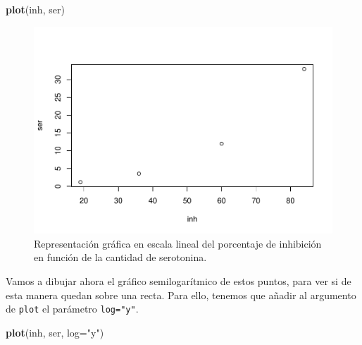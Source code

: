 \documentclass[
]{book}
\newenvironment{Shaded}{\begin{snugshade}}{\end{snugshade}}
\newcommand{\DataTypeTok}[1]{\textcolor[rgb]{0.13,0.29,0.53}{#1}}
\newcommand{\KeywordTok}[1]{\textcolor[rgb]{0.13,0.29,0.53}{\textbf{#1}}}
\newcommand{\NormalTok}[1]{#1}
\newcommand{\StringTok}[1]{\textcolor[rgb]{0.31,0.60,0.02}{#1}}
\theoremstyle{definition}
\theoremstyle{definition}
\theoremstyle{definition}
\theoremstyle{remark}
\begin{document}
\begin{Shaded}
\begin{Highlighting}[]
\KeywordTok{plot}\NormalTok{(inh, ser)}
\end{Highlighting}
\end{Shaded}

\begin{figure}

{\centering \includegraphics[width=0.9\linewidth]{03chap02_Un_aperitivo_files/figure-latex/F304bis-1} 

}

\caption{Representación gráfica en escala lineal del porcentaje de inhibición en función de la cantidad de serotonina.}\label{fig:F304bis}
\end{figure}

Vamos a dibujar ahora el gráfico semilogarítmico de estos puntos, para ver si de esta manera quedan sobre una recta. Para ello, tenemos que añadir al argumento de \texttt{plot} el parámetro \texttt{log="y"}.

\begin{Shaded}
\begin{Highlighting}[]
\KeywordTok{plot}\NormalTok{(inh, ser, }\DataTypeTok{log=}\StringTok{"y"}\NormalTok{)}
\end{Highlighting}
\end{Shaded}
\end{document}
